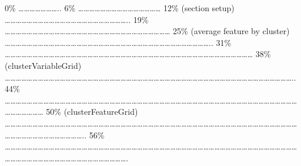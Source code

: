\documentclass[
]{article}
\begin{document}
\textbar{} \textbar{} \textbar{} 0\% \textbar{}
\textbar\ldots\ldots\ldots\ldots\ldots\ldots\ldots.. \textbar{} 6\%
\textbar{}
\textbar\ldots\ldots\ldots\ldots\ldots\ldots\ldots\ldots\ldots\ldots\ldots\ldots\ldots\ldots\ldots{}
\textbar{} 12\% (section setup) \textbar{}
\textbar\ldots\ldots\ldots\ldots\ldots\ldots\ldots\ldots\ldots\ldots\ldots\ldots\ldots\ldots\ldots\ldots\ldots\ldots\ldots\ldots\ldots\ldots..
\textbar{} 19\% \textbar{}
\textbar\ldots\ldots\ldots\ldots\ldots\ldots\ldots\ldots\ldots\ldots\ldots\ldots\ldots\ldots\ldots\ldots\ldots\ldots\ldots\ldots\ldots\ldots\ldots\ldots\ldots\ldots\ldots\ldots\ldots\ldots{}
\textbar{} 25\% (average feature by cluster) \textbar{}
\textbar\ldots\ldots\ldots\ldots\ldots\ldots\ldots\ldots\ldots\ldots\ldots\ldots\ldots\ldots\ldots\ldots\ldots\ldots\ldots\ldots\ldots\ldots\ldots\ldots\ldots\ldots\ldots\ldots\ldots\ldots\ldots\ldots\ldots\ldots\ldots\ldots\ldots..
\textbar{} 31\% \textbar{}
\textbar\ldots\ldots\ldots\ldots\ldots\ldots\ldots\ldots\ldots\ldots\ldots\ldots\ldots\ldots\ldots\ldots\ldots\ldots\ldots\ldots\ldots\ldots\ldots\ldots\ldots\ldots\ldots\ldots\ldots\ldots\ldots\ldots\ldots\ldots\ldots\ldots\ldots\ldots\ldots\ldots\ldots\ldots\ldots\ldots\ldots{}
\textbar{} 38\% (clusterVariableGrid) \textbar{}
\textbar\ldots\ldots\ldots\ldots\ldots\ldots\ldots\ldots\ldots\ldots\ldots\ldots\ldots\ldots\ldots\ldots\ldots\ldots\ldots\ldots\ldots\ldots\ldots\ldots\ldots\ldots\ldots\ldots\ldots\ldots\ldots\ldots\ldots\ldots\ldots\ldots\ldots\ldots\ldots\ldots\ldots\ldots\ldots\ldots\ldots\ldots\ldots\ldots\ldots\ldots\ldots\ldots..
\textbar{} 44\% \textbar{}
\textbar\ldots\ldots\ldots\ldots\ldots\ldots\ldots\ldots\ldots\ldots\ldots\ldots\ldots\ldots\ldots\ldots\ldots\ldots\ldots\ldots\ldots\ldots\ldots\ldots\ldots\ldots\ldots\ldots\ldots\ldots\ldots\ldots\ldots\ldots\ldots\ldots\ldots\ldots\ldots\ldots\ldots\ldots\ldots\ldots\ldots\ldots\ldots\ldots\ldots\ldots\ldots\ldots\ldots\ldots\ldots\ldots\ldots\ldots\ldots\ldots{}
\textbar{} 50\% (clusterFeatureGrid) \textbar{}
\textbar\ldots\ldots\ldots\ldots\ldots\ldots\ldots\ldots\ldots\ldots\ldots\ldots\ldots\ldots\ldots\ldots\ldots\ldots\ldots\ldots\ldots\ldots\ldots\ldots\ldots\ldots\ldots\ldots\ldots\ldots\ldots\ldots\ldots\ldots\ldots\ldots\ldots\ldots\ldots\ldots\ldots\ldots\ldots\ldots\ldots\ldots\ldots\ldots\ldots\ldots\ldots\ldots\ldots\ldots\ldots\ldots\ldots\ldots\ldots\ldots\ldots\ldots\ldots\ldots\ldots\ldots\ldots..
\textbar{} 56\% \textbar{}
\textbar\ldots\ldots\ldots\ldots\ldots\ldots\ldots\ldots\ldots\ldots\ldots\ldots\ldots\ldots\ldots\ldots\ldots\ldots\ldots\ldots\ldots\ldots\ldots\ldots\ldots\ldots\ldots\ldots\ldots\ldots\ldots\ldots\ldots\ldots\ldots\ldots\ldots\ldots\ldots\ldots\ldots\ldots\ldots\ldots\ldots\ldots\ldots\ldots\ldots\ldots\ldots\ldots\ldots\ldots\ldots\ldots\ldots\ldots\ldots\ldots\ldots\ldots\ldots\ldots\ldots\ldots\ldots\ldots\ldots\ldots\ldots\ldots\ldots\ldots\ldots.
\end{document}
